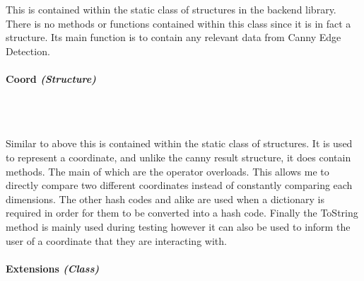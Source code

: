 \begin{FlushLeft}
    This is contained within the static class of structures in the backend library. There is no methods or functions contained within this class since it is in fact a structure. Its main function is to contain any relevant data from Canny Edge Detection.

    \bk

    \paragraph{Coord \textit{(Structure)}} \mbox{} \\

    \begin{figure}[H]
        \centering
    \end{figure}\\

    Similar to above this is contained within the static class of structures. It is used to represent a coordinate, and unlike the canny result structure, it does contain methods. The main of which are the operator overloads. This allows me to directly compare two different coordinates instead of constantly comparing each dimensions. The other hash codes and alike are used when a dictionary is required in order for them to be converted into a hash code. Finally the ToString method is mainly used during testing however it can also be used to inform the user of a coordinate that they are interacting with.

    \bk

    \paragraph{Extensions \textit{(Class)}} \mbox{} \\

    \begin{figure}[H]
        \centering
    \end{figure}\\


\end{FlushLeft}
